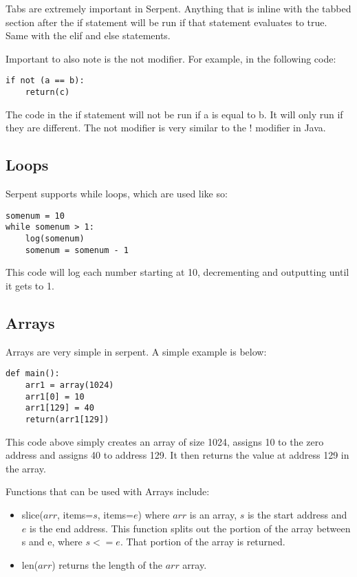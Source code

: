 \documentclass[12pt]{article}
\begin{document}
	Tabs are extremely important in Serpent. Anything that is inline with the tabbed section after the if statement will be run if that statement evaluates to true. Same with the elif and else statements. 
	
	Important to also note is the not modifier. For example, in the following code:
	
\begin{lstlisting}
if not (a == b):
	return(c)
\end{lstlisting}

The code in the if statement will not be run if a is equal to b. It will only run if they are different. The not modifier is very similar to the ! modifier in Java.
	
\subsection{Loops}
Serpent supports while loops, which are used like so:
\begin{lstlisting}
somenum = 10
while somenum > 1:
	log(somenum)
	somenum = somenum - 1
\end{lstlisting}

This code will log each number starting at 10, decrementing and outputting until it gets to 1.

\subsection{Arrays}
Arrays are very simple in serpent. A simple example is below:
\begin{lstlisting}
def main():
	arr1 = array(1024)
	arr1[0] = 10
	arr1[129] = 40
	return(arr1[129])
\end{lstlisting}

This code above simply creates an array of size 1024, assigns 10 to the zero address and assigns 40 to address 129. It then returns the value at address 129 in the array. 

Functions that can be used with Arrays include:
\begin{itemize}
	\item slice($arr$, items=$s$, items=$e$) where $arr$ is an array, $s$ is the start address and $e$ is the end address. This function splits out the portion of the array between s and e, where $s <= e$. That portion of the array is returned.
	\item len($arr$) returns the length of the $arr$ array.
\end{itemize}
\end{document}

